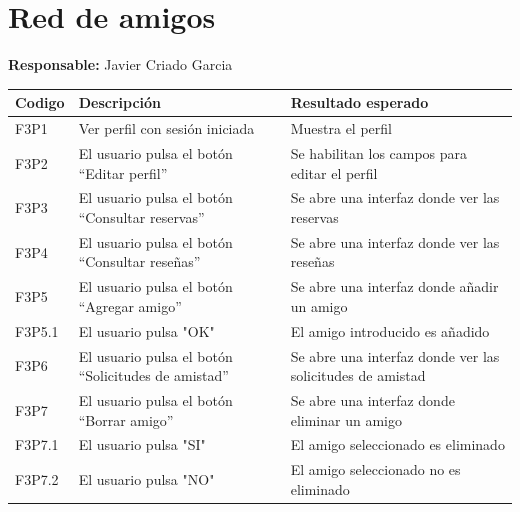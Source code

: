 ﻿\documentclass{report}
\begin{document}
        \section{Red de amigos} 
            \begin{center}
                \textbf{Responsable:} Javier Criado Garcia\\
                \begin{longtable}{|m{2cm}|m{4cm}|m{4cm}|}
                    \hline
                    Codigo & Descripción & Resultado esperado \\
                    \hline
                    \endhead 
                    \hline
                    F3P1 & Ver perfil con sesión iniciada & Muestra el perfil  \\
                    \hline
                    F3P2 & El usuario pulsa el botón “Editar perfil”  & Se habilitan los campos para editar el perfil   \\
                    \hline
                    F3P3 & El usuario pulsa el botón “Consultar reservas” & Se abre una interfaz donde ver las reservas   \\
                    \hline
                    F3P4 & El usuario pulsa el botón “Consultar reseñas” &  Se abre una interfaz donde ver las reseñas \\
                    \hline
                    F3P5 & El usuario pulsa el botón “Agregar amigo” & Se abre una interfaz donde añadir un amigo  \\
                    \hline
                    F3P5.1 & El usuario pulsa "OK" & El amigo introducido es añadido  \\
                    \hline
                    F3P6 & El usuario pulsa el botón “Solicitudes de amistad” & Se abre una interfaz donde ver las solicitudes de amistad  \\
                    \hline
                    F3P7 & El usuario pulsa el botón “Borrar amigo” & Se abre una interfaz donde eliminar un amigo   \\
                    \hline  
                    F3P7.1 & El usuario pulsa "SI"  &  El amigo seleccionado es eliminado \\ 
                    \hline    
                    F3P7.2 & El usuario pulsa "NO"  &  El amigo seleccionado no es eliminado \\ 
                    \hline          
                \end{longtable}
            \end{center}
            \clearpage
\end{document}
